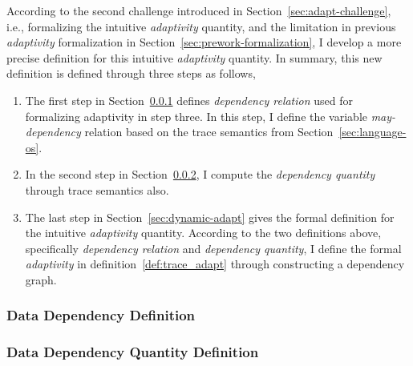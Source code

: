 According to the second challenge introduced in Section~\ref{sec:adapt-challenge},
i.e., formalizing the intuitive \emph{adaptivity} quantity,
and the limitation in previous \emph{adaptivity} formalization in Section~\ref{sec:prework-formalization},
I develop a more precise
definition for this intuitive \emph{adaptivity} quantity.
%
%
In summary, this new
definition is defined through three steps as follows,
\begin{enumerate}
\item The first step in Section~\ref{sec:dynamic-datadep} defines \emph{dependency relation} used for formalizing adaptivity in step three.
In this step, I define the variable \emph{may-dependency} relation based on the trace semantics from Section~\ref{sec:language-os}.
\item In the second step in Section~\ref{sec:dynamic-reachability}, I compute the \emph{dependency quantity} through 
trace semantics also.
\item The last step in Section~\ref{sec:dynamic-adapt} gives the formal definition for the intuitive \emph{adaptivity} quantity. 
According to the two definitions above, specifically \emph{dependency relation} and \emph{dependency quantity},
I define the formal \emph{adaptivity} in definition~\ref{def:trace_adapt} through 
constructing a dependency graph.
\end{enumerate}

\subsubsection{Data Dependency Definition}
\label{sec:dynamic-datadep}


\subsubsection{Data Dependency Quantity Definition}
\label{sec:dynamic-reachability}
%
